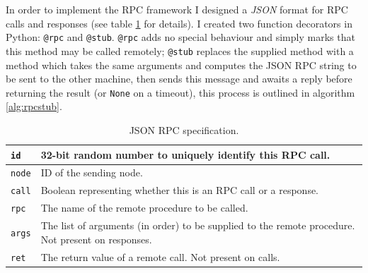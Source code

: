 \documentclass[12pt,notitlepage,a4paper]{report}
\begin{document}
	In order to implement the RPC framework I designed a \emph{JSON} format for RPC calls and responses (see table \ref{tab:rpcjson} for details). I created two function decorators in Python: \texttt{@rpc} and \texttt{@stub}. \texttt{@rpc} adds no special behaviour and simply marks that this method may be called remotely; \texttt{@stub} replaces the supplied method with a method which takes the same arguments and computes the JSON RPC string to be sent to the other machine, then sends this message and awaits a reply before returning the result (or \texttt{None} on a timeout), this process is outlined in algorithm \ref{alg:rpcstub}.
	\begin{table}
		\begin{tabularx}{\textwidth}{| l | X |}
			\hline 
			\texttt{id} & 32-bit random number to uniquely identify this RPC call.\\
			\hline
			\texttt{node} & ID of the sending node.\\
			\hline
			\texttt{call} & Boolean representing whether this is an RPC call or a response.\\
			\hline
			\texttt{rpc} & The name of the remote procedure to be called.\\
			\hline
			\texttt{args} & The list of arguments (in order) to be supplied to the remote procedure. Not present on responses.\\
			\hline
			\texttt{ret} & The return value of a remote call. Not present on calls.\\
			\hline
		\end{tabularx}
	\caption{JSON RPC specification.}
	\label{tab:rpcjson}
	\end{table}
\end{document}
